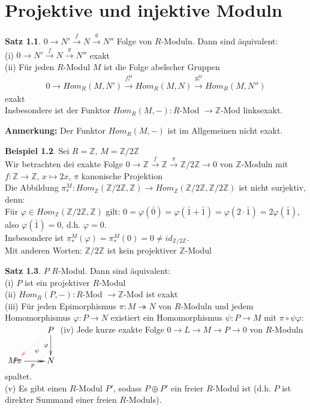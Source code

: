 \documentclass[10pt,a4paper,numbers=endperiod]{scrreprt}
\theoremstyle{definition}
\newtheorem{satz}{Satz}[section]
\newtheorem{bsp}[satz]{Beispiel}
\def\ZZ{{\mathbb Z}}
\begin{document}
\chapter{Projektive und injektive Moduln}

\begin{satz}
	$0 \to N' \overset{f}{\to} N \overset{g}{\to} N''$ Folge von $R$-Moduln. Dann sind äquivalent:\\
	(i) $0 \to N' \overset{f}{\to} N \overset{g}{\to} N''$ exakt\\
	(ii) Für jeden $R$-Modul $M$ ist die Folge abelscher Gruppen \begin{align*}
		0 \to Hom_R (M, N') \overset{f_*^M}{\to} Hom_R(M,N) \overset{g_*^M}{\to} Hom_R(M, N'')
	\end{align*}
	exakt\\
	Insbesondere ist der Funktor $Hom_R(M, -): R$-Mod $\to \ZZ$-Mod linksexakt.
\end{satz}

\textbf{Anmerkung:} Der Funktor $Hom_R(M, -)$ ist im Allgemeinen nicht exakt.

\begin{bsp}
	Sei $R = \ZZ$, $M = \ZZ/2 \ZZ$\\
	Wir betrachten dei exakte Folge $0 \to \ZZ \overset{f}{\to} \ZZ \overset{\pi}{\to} \ZZ/2\ZZ \to 0$ von $\ZZ$-Moduln mit $f: \ZZ \to \ZZ$, $x \mapsto 2x$, $\pi$ kanonische Projektion\\
	Die Abbildung $\pi_*^M: Hom_\ZZ(\ZZ/2\ZZ, \ZZ) \to Hom_\ZZ(\ZZ/2\ZZ, \ZZ/2\ZZ)$ ist nicht surjektiv, denn:\\
	Für $\varphi \in Hom_\ZZ (\ZZ/2\ZZ, \ZZ)$ gilt: $0 = \varphi(\bar{0}) = \varphi(\bar{1} + \bar{1}) = \varphi(2 \cdot \bar{1}) = 2 \varphi(\bar{1})$, also $\varphi(\bar{1}) = 0$, d.h. $\varphi = 0$.\\
	Insbesondere ist $\pi_*^M(\varphi) = \pi_*^M(0) = 0 \neq id_{\ZZ/2\ZZ}$.\\
	Mit anderen Worten: $\ZZ/2\ZZ$ ist kein projektiver $\ZZ$-Modul
\end{bsp}

\begin{satz}
	$P$ $R$-Modul. Dann sind äquivalent:\\
	(i) $P$ ist ein projektiver $R$-Modul\\
	(ii) $Hom_R (P, -): R$-Mod $\to \ZZ$-Mod ist exakt\\
	(iii) Für jeden Epimorphismus $\pi: M \twoheadrightarrow N$ von $R$-Moduln und jedem Homomorphismus $\varphi: P \to N$ existiert ein Homomorphismus $\psi: P \to M$ mit $\pi \circ \psi \varphi$: $\xymatrix{
		& P \ar[d]_\varphi \ar@[red]@{.>}[dl]^\psi\\
		M \ar\ar@{->>}[r]_p\pi & N
	}$
	(iv) Jede kurze exakte Folge $0 \to L \to M \to P \to 0$ von $R$-Moduln spaltet.\\
	(v) Es gibt einen $R$-Modul $P'$, sodass $P \oplus P'$ ein freier $R$-Modul ist (d.h. $P$ ist direkter Summand einer freien $R$-Moduls). 
\end{satz}
\end{document}
